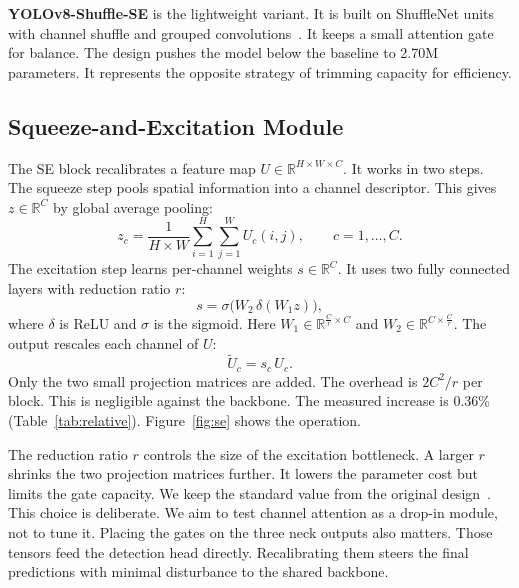\documentclass[conference,a4paper]{IEEEtran}
\begin{document}
\textbf{YOLOv8-Shuffle-SE} is the lightweight variant. It is built on
ShuffleNet units with channel shuffle and grouped
convolutions~\cite{ma2018shufflenet}. It keeps a small attention gate for
balance. The design pushes the model below the baseline to 2.70M parameters. It
represents the opposite strategy of trimming capacity for efficiency.

\subsection{Squeeze-and-Excitation Module}
The SE block recalibrates a feature map $U \in \mathbb{R}^{H \times W \times
C}$. It works in two steps. The squeeze step pools spatial information into a
channel descriptor. This gives $z \in \mathbb{R}^{C}$ by global average
pooling:
\begin{equation}
z_c = \frac{1}{H \times W} \sum_{i=1}^{H} \sum_{j=1}^{W} U_c(i,j),
\qquad c = 1,\dots,C .
\end{equation}
The excitation step learns per-channel weights $s \in \mathbb{R}^{C}$. It uses
two fully connected layers with reduction ratio $r$:
\begin{equation}
s = \sigma\!\big(W_2\,\delta(W_1 z)\big),
\end{equation}
where $\delta$ is ReLU and $\sigma$ is the sigmoid. Here $W_1 \in
\mathbb{R}^{\frac{C}{r} \times C}$ and $W_2 \in \mathbb{R}^{C \times
\frac{C}{r}}$. The output rescales each channel of $U$:
\begin{equation}
\tilde{U}_c = s_c \, U_c .
\end{equation}
Only the two small projection matrices are added. The overhead is $2C^2/r$
per block. This is negligible against the backbone. The measured increase is
0.36\% (Table~\ref{tab:relative}). Figure~\ref{fig:se} shows the operation.

The reduction ratio $r$ controls the size of the excitation bottleneck. A
larger $r$ shrinks the two projection matrices further. It lowers the parameter
cost but limits the gate capacity. We keep the standard value from the original
design~\cite{hu2018squeeze}. This choice is deliberate. We aim to test channel
attention as a drop-in module, not to tune it. Placing the gates on the three
neck outputs also matters. Those tensors feed the detection head directly.
Recalibrating them steers the final predictions with minimal disturbance to the
shared backbone.
\end{document}
